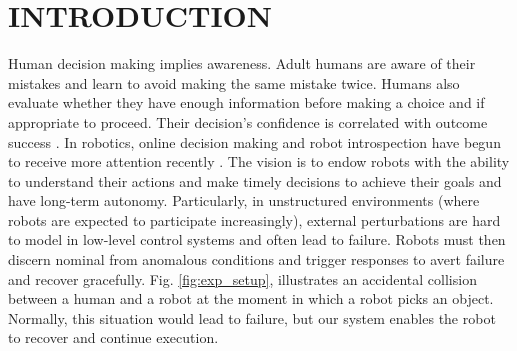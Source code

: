 \documentclass[letterpaper, 10 pt, conference]{ieeeconf}  %
\begin{document}
\section{INTRODUCTION}\label{sec:Intro}
%
%
Human decision making implies awareness. Adult humans are aware of their mistakes and learn to avoid making the same mistake twice. Humans also evaluate whether they have enough information before making a choice and if appropriate to proceed. Their decision's confidence is correlated with outcome success \cite{2014CNMC-Yeung-SharedMechsConfJudg_ErrDet_HumanDecisionMaking}. In robotics, online decision making and robot introspection have begun to receive more attention recently \cite{2011IROS-Rodriguez-AbortRetry,2013IROS-DiLello-BayesianContFaultDetection,2014ICRA-kroemer-LearnPredictPhasesManipHiddenStates, 2014ICRA-Rojas-EarlyFC, 2015RSS-Kappler-DateDrivenOnlineDecisionMakingManipu, 2016ICRA-Park-MultiModalMonitoringAnomalyDet_RobotManip, 2017iros-rojas-onlinewrenchintrospection}. The vision is to endow robots with the ability to understand their actions and make timely decisions to achieve their goals and have long-term autonomy. Particularly, in unstructured environments (where robots are expected to participate increasingly), external perturbations are hard to model in low-level control systems and often lead to failure. Robots must then discern nominal from anomalous conditions and trigger responses to avert failure and recover gracefully. Fig. \ref{fig:exp_setup}, illustrates an accidental collision between a human and a robot at the moment in which a robot picks an object. Normally, this situation would lead to failure, but our system enables the robot to recover and continue execution. 
\end{document}
